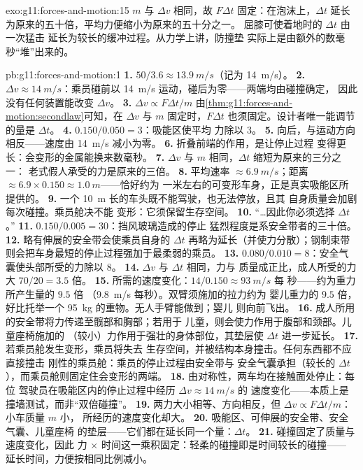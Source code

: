 \begin{solution}{exo:g11:forces-and-motion:15}
$m$ 与 $\Delta v$ 相同，故 $F\Delta t$ 固定：在泡沫上，$\Delta t$
延长为原来的五十倍，平均力便缩小为原来的五十分之一。
屈膝可使着地时的 $\Delta t$ 由一次猛击
延长为较长的缓冲过程。从力学上讲，防撞垫
实际上是由额外的数毫秒“堆”出来的。
\end{solution}

\begin{solution}{pb:g11:forces-and-motion:1}
\textbf{1.} $50/3.6 \approx \qty{13.9}{m/s}$（记为 \qty{14}{m/s}）。
\textbf{2.} $\Delta v \approx \qty{14}{m/s}$：乘员碰前以
\qty{14}{m/s} 运动，碰后为零——两端均由碰撞确定，
因此没有任何装置能改变 $\Delta v$。
\textbf{3.} $\Delta v \propto F\Delta t/m$
由\cref{thm:g11:forces-and-motion:secondlaw}可知，在 $\Delta v$ 与 $m$
固定时，$F\Delta t$ 也须固定。设计者唯一能调节的量是
$\Delta t$。
\textbf{4.} $0.150/0.050 = 3$：吸能区使平均
力除以 $3$。
\textbf{5.} 向后，与运动方向相反——速度由
\qty{14}{m/s} 减小为零。
\textbf{6.} 折叠前端的作用，是让停止过程
变得更长：会变形的金属能换来数毫秒。
\textbf{7.} $\Delta v$ 与 $m$ 相同，$\Delta t$ 缩短为原来的三分之一：
老式假人承受的力是原来的三倍。
\textbf{8.} 平均速率 $\approx \qty{6.9}{m/s}$；距离 $\approx
6.9 \times 0.150 \approx \qty{1.0}{m}$——恰好约为
一米左右的可变形车身，正是真实吸能区所提供的。
\textbf{9.} 一个 \qty{10}{m} 长的车头既不能驾驶，也无法停放，且其
自身质量会加剧每次碰撞。乘员舱决不能
变形：它须保留生存空间。
\textbf{10.} “\dots 因此你必须选择 $\Delta t$。”
\textbf{11.} $0.150/0.005 = 30$：挡风玻璃造成的停止
猛烈程度是系安全带者的三十倍。
\textbf{12.} 略有伸展的安全带会使乘员自身的
$\Delta t$ 再略为延长（并使力分散）；钢制束带
则会把车身最短的停止过程强加于最柔弱的乘员。
\textbf{13.} $0.080/0.010 = 8$：安全气囊使头部所受的力除以
$8$。
\textbf{14.} $\Delta v$ 与 $\Delta t$ 相同，力与
质量成正比，成人所受的力大 $70/20 = 3.5$ 倍。
\textbf{15.} 所需的速度变化：$14/0.150 \approx \qty{93}{m/s}$ 每
秒——约为重力所产生量的 $9.5$ 倍
（\qty{9.8}{m/s} 每秒）。双臂须施加的拉力约为
婴儿重力的 $9.5$ 倍，好比托举一个 \qty{95}{kg} 的重物。无人手臂能做到；婴儿
则向前飞出。
\textbf{16.} 成人所用的安全带将力传递至髋部和胸部；若用于
儿童，则会使力作用于腹部和颈部。儿童座椅施加的
（较小）力作用于强壮的身体部位，其垫层使
$\Delta t$ 进一步延长。
\textbf{17.} 若乘员舱发生变形，乘员将失去
生存空间，并被结构本身撞击。任何东西都不应直接撞击
刚性的乘员舱：乘员的停止过程由安全带与
安全气囊承担（较长的 $\Delta t$），而乘员舱则固定住会变形的两端。
\textbf{18.} 由对称性，两车均在接触面处停止：每位
驾驶员在吸能区内的停止过程中经历 $\Delta v \approx \qty{14}{m/s}$ 的
速度变化——本质上是撞墙测试，而非“双倍碰撞”。
\textbf{19.} 两力大小相等、方向相反，但
$\Delta v \propto F\Delta t/m$：小车质量 $m$ 小，
所经历的速度变化却大。
\textbf{20.} 吸能区、可伸展的安全带、安全气囊、儿童座椅
的垫层——它们都在延长同一个量：$\Delta t$。
\textbf{21.} 碰撞固定了质量与速度变化，因此
力 $\times$ 时间这一乘积固定：轻柔的碰撞即是时间较长的碰撞——
延长时间，力便按相同比例减小。
\end{solution}
